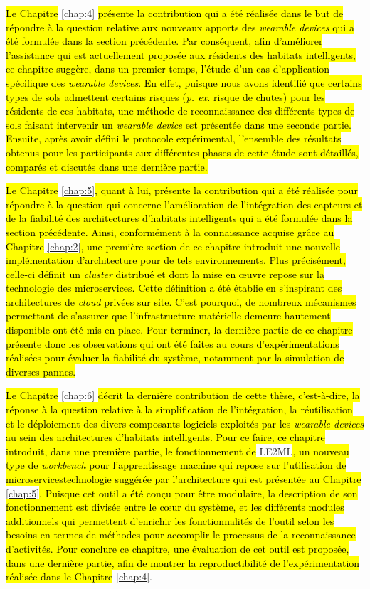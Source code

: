 {{\hl{Le Chapitre} \ref{chap:4} \hl{présente la contribution qui a été réalisée dans le but de répondre à la question relative aux nouveaux apports des \textit{wearable devices} qui a été formulée dans la section précédente. Par conséquent, afin d'améliorer l'assistance qui est actuellement proposée aux résidents des habitats intelligents, ce chapitre suggère, dans un premier temps, l'étude d'un cas d'application spécifique des \textit{wearable devices}. En effet, puisque nous avons identifié que certains types de sols admettent certains risques (\textit{p. ex.} risque de chutes) pour les résidents de ces habitats, une méthode de reconnaissance des différents types de sols faisant intervenir un \textit{wearable device} est présentée dans une seconde partie. Ensuite, après avoir défini le protocole expérimental, l'ensemble des résultats obtenus pour les participants aux différentes phases de cette étude sont détaillés, comparés et discutés dans une dernière partie.}

\hl{Le Chapitre} \ref{chap:5}\hl{, quant à lui, présente la contribution qui a été réalisée pour répondre à la question qui concerne l'amélioration de l'intégration des capteurs et de la fiabilité des architectures d'habitats intelligents qui a été formulée dans la section précédente. Ainsi, conformément à la connaissance acquise grâce au Chapitre} \ref{chap:2}\hl{, une première section de ce chapitre introduit une nouvelle implémentation d'architecture pour de tels environnements. Plus précisément, celle-ci définit un \textit{cluster} distribué et dont la mise en \oe{}uvre repose sur la technologie des microservices. Cette définition a été établie en s'inspirant des architectures de \textit{cloud} privées sur site. C'est pourquoi, de nombreux mécanismes permettant de s'assurer que l'infrastructure matérielle demeure hautement disponible ont été mis en place. Pour terminer, la dernière partie de ce chapitre présente donc les observations qui ont été faites au cours d'expérimentations réalisées pour évaluer la fiabilité du système, notamment par la simulation de diverses pannes.}

\hl{Le Chapitre} \ref{chap:6} \hl{décrit la dernière contribution de cette thèse, c'est-à-dire, la réponse à la question relative à la simplification de l'intégration, la réutilisation et le déploiement des divers composants logiciels exploités par les \textit{wearable devices} au sein des architectures d'habitats intelligents. Pour ce faire, ce chapitre introduit, dans une première partie, le fonctionnement de} \ac{LE2ML}\hl{, un nouveau type de \textit{workbench} pour l'apprentissage machine qui repose sur l'utilisation de microservices\textemdash technologie suggérée par l'architecture qui est présentée au Chapitre} \ref{chap:5}\hl{. Puisque cet outil a été conçu pour être modulaire, la description de son fonctionnement est divisée entre le c\oe{}ur du système, et les différents modules additionnels qui permettent d'enrichir les fonctionnalités de l'outil selon les besoins en termes de méthodes pour accomplir le processus de la reconnaissance d'activités. Pour conclure ce chapitre, une évaluation de cet outil est proposée, dans une dernière partie, afin de montrer la reproductibilité de l'expérimentation réalisée dans le Chapitre} \ref{chap:4}.

}}
